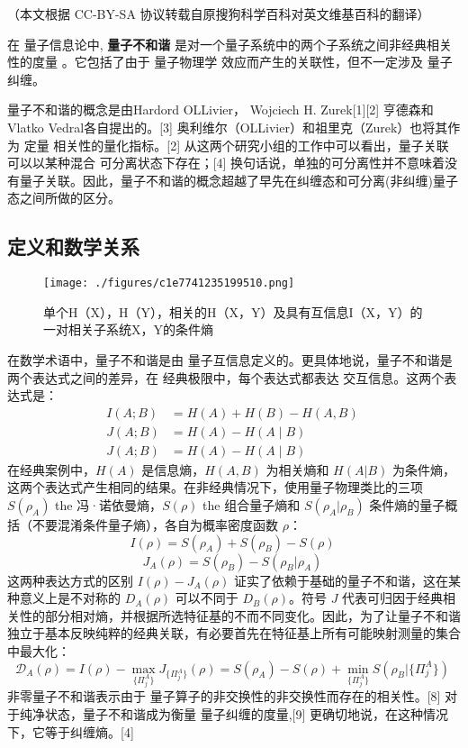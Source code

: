 
（本文根据 CC-BY-SA 协议转载自原搜狗科学百科对英文维基百科的翻译）

在 量子信息论中, \textbf{量子不和谐} 是对一个量子系统中的两个子系统之间非经典相关性的度量 。它包括了由于 量子物理学 效应而产生的关联性，但不一定涉及 量子纠缠。

量子不和谐的概念是由Hardord OLLivier， Wojciech H. Zurek[1][2] 亨德森和 Vlatko Vedral各自提出的。[3] 奥利维尔（OLLivier）和祖里克（Zurek）也将其作为 定量 相关性的量化指标。[2] 从这两个研究小组的工作中可以看出，量子关联可以以某种混合 可分离状态下存在；[4] 换句话说，单独的可分离性并不意味着没有量子关联。因此，量子不和谐的概念超越了早先在纠缠态和可分离(非纠缠)量子态之间所做的区分。

\subsection{定义和数学关系}
\begin{figure}[ht]
\centering
\texttt{[image: ./figures/c1e7741235199510.png]}
\caption{单个H（X），H（Y），相关的H（X，Y）及具有互信息I（X，Y）的一对相关子系统X，Y的条件熵} \label{fig_LZBHX_1}
\end{figure}
在数学术语中，量子不和谐是由 量子互信息定义的。更具体地说，量子不和谐是两个表达式之间的差异，在 经典极限中，每个表达式都表达 交互信息。这两个表达式是：
\begin{equation}
\begin{aligned}
I(A; B) &= H(A) + H(B) - H(A, B) \\
J(A; B) &= H(A) - H(A \mid B) \\
J(A; B) &= H(A) - H(A \mid B)
\end{aligned}~
\end{equation}
在经典案例中，$H(A)$ 是信息熵，$H(A, B)$ 为相关熵和 $H(A|B)$ 为条件熵，这两个表达式产生相同的结果。在非经典情况下，使用量子物理类比的三项 $S(\rho_A)$ the 冯·诺依曼熵，$S(\rho)$ the 组合量子熵和 $S(\rho_A|\rho_B)$ 条件熵的量子概括（不要混淆条件量子熵），各自为概率密度函数 $\rho$：
$$I(\rho) = S(\rho_A) + S(\rho_B) - S(\rho)~$$
$$J_A(\rho) = S(\rho_B) - S(\rho_B|\rho_A)~$$
这两种表达方式的区别 $I(\rho) - J_A(\rho)$ 证实了依赖于基础的量子不和谐，这在某种意义上是不对称的 $D_A(\rho)$ 可以不同于 $D_B(\rho)$。符号 $J$ 代表可归因于经典相关性的部分相对熵，并根据所选特征基的不而不同变化。因此，为了让量子不和谐独立于基本反映纯粹的经典关联，有必要首先在特征基上所有可能映射测量的集合中最大化：
$$\mathcal{D}_A(\rho) = I(\rho) - \max_{\{\Pi_j^A\}} J_{\{\Pi_j^A\}} (\rho) = S(\rho_A) - S(\rho) + \min_{\{\Pi_j^A\}} S(\rho_B|\{\Pi_j^A\})~$$
非零量子不和谐表示由于 量子算子的非交换性的非交换性而存在的相关性。[8] 对于纯净状态，量子不和谐成为衡量 量子纠缠的度量,[9] 更确切地说，在这种情况下，它等于纠缠熵。[4]

